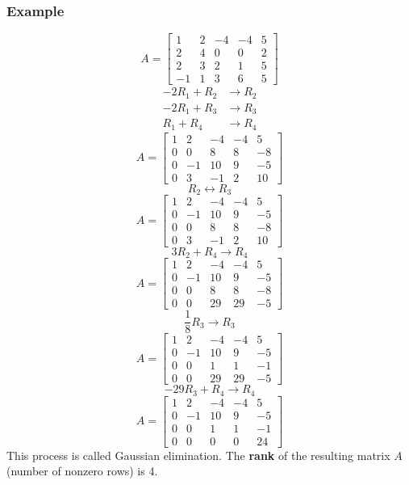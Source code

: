 \documentclass[letterpaper, 12pt]{math}
\begin{document}
\subsubsection*{Example}
\[ A = \begin{bmatrix}
  1 & 2 & -4 & -4 & 5 \\
  2 & 4 & 0 & 0 & 2 \\
  2 & 3 & 2 & 1 & 5 \\
  -1 & 1 & 3 & 6 & 5
\end{bmatrix} \]
\begin{align*}
  -2R_1+R_2 &\to R_2 \\
  -2R_1+R_3 &\to R_3 \\
  R_1+R_4 &\to R_4
\end{align*}
\[ A = \begin{bmatrix}
  1 & 2 & -4 & -4 & 5 \\
  0 & 0 & 8 & 8 & -8 \\
  0 & -1 & 10 & 9 & -5 \\
  0 & 3 & -1 & 2 & 10
\end{bmatrix} \]
\[ R_2 \leftrightarrow R_3 \]
\[ A = \begin{bmatrix}
  1 & 2 & -4 & -4 & 5 \\
  0 & -1 & 10 & 9 & -5 \\
  0 & 0 & 8 & 8 & -8 \\
  0 & 3 & -1 & 2 & 10
\end{bmatrix} \]
\[ 3R_2+R_4 \to R_4 \]
\[ A = \begin{bmatrix}
  1 & 2 & -4 & -4 & 5 \\
  0 & -1 & 10 & 9 & -5 \\
  0 & 0 & 8 & 8 & -8 \\
  0 & 0 & 29 & 29 & -5
\end{bmatrix} \]
\[ \frac{1}{8}R_3 \to R_3 \]
\[ A = \begin{bmatrix}
  1 & 2 & -4 & -4 & 5 \\
  0 & -1 & 10 & 9 & -5 \\
  0 & 0 & 1 & 1 & -1 \\
  0 & 0 & 29 & 29 & -5
\end{bmatrix} \]
\[ -29R_3+R_4 \to R_4 \]
\[ A = \begin{bmatrix}
  1 & 2 & -4 & -4 & 5 \\
  0 & -1 & 10 & 9 & -5 \\
  0 & 0 & 1 & 1 & -1 \\
  0 & 0 & 0 & 0 & 24
\end{bmatrix} \]
This process is called Gaussian elimination. The \textbf{rank} of the resulting
matrix \( A \) (number of nonzero rows) is 4.
\end{document}
